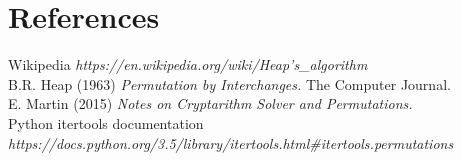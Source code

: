 \documentclass{article}
\begin{document}
\section*{References} %

Wikipedia \textit{https://en.wikipedia.org/wiki/Heap's\_algorithm}\\
B.R. Heap (1963) \textit{Permutation by Interchanges.} The Computer Journal.\\
E. Martin (2015) \textit{Notes on Cryptarithm Solver and Permutations.}\\
Python itertools documentation \textit{https://docs.python.org/3.5/library/itertools.html\#itertools.permutations}

\end{document}
